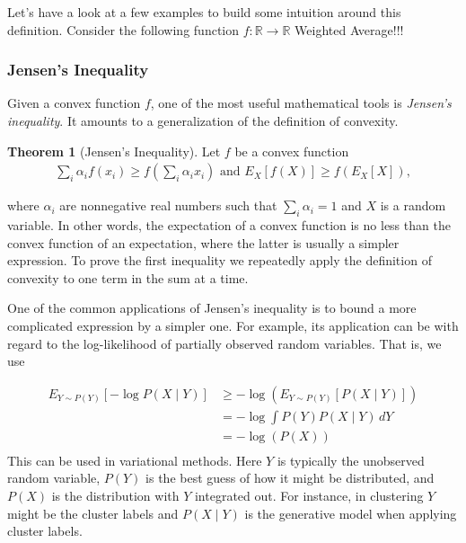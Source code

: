\documentclass[a4paper,12pt]{article}
\theoremstyle{definition}
\newtheorem*{theorem}{Theorem}
\newcommand{\R}{\mathbb{R}}
\begin{document}
Let's have a look at a few examples to build some intuition around this definition.
Consider the following function $f : \R \to \R$
Weighted Average!!!

\subsubsection*{Jensen's Inequality}
Given a convex function $f$, one of the most useful mathematical tools is \emph{Jensen's inequality}. It amounts to a generalization of the definition of convexity.
\begin{theorem}[Jensen's Inequality]
    Let $f$ be a convex function
    \begin{equation*}
        \begin{aligned}
            \sum_i \alpha_i f(x_i)  \geq f\left(\sum_i \alpha_i x_i\right)    \text{ and }    E_X[f(X)]  \geq f\left(E_X[X]\right),
        \end{aligned}
    \end{equation*}
\end{theorem}

where $\alpha_i$ are nonnegative real numbers such that $\sum_i \alpha_i = 1$ and $X$ is 
a random variable. In other words, the expectation of a convex function is no less than 
the convex function of an expectation, where the latter is usually a simpler expression. 
To prove the first inequality we repeatedly apply the definition of convexity to one term 
in the sum at a time.

One of the common applications of Jensen's inequality is to bound a more complicated 
expression by a simpler one. For example, its application can be with regard to the 
log-likelihood of partially observed random variables. That is, we use

\begin{equation*}
    \begin{aligned}
        E_{Y \sim P(Y)}[-\log P(X \mid Y)] &\geq -\log(E_{Y \sim P(Y)}[P(X \mid Y)])  \\
                                           &= -\log \int P(Y) P(X \mid Y) \,dY \\
                                           &= -\log(P(X)) \\
    \end{aligned}
\end{equation*}
This can be used in variational methods. Here $Y$ is typically the unobserved random variable, $P(Y)$ is the best guess of how it might be distributed, and $P(X)$ 
is the distribution with $Y$ integrated out. For instance, in clustering $Y$ might be the cluster labels and $P(X \mid Y)$ is the generative model when applying cluster labels.
\end{document}

